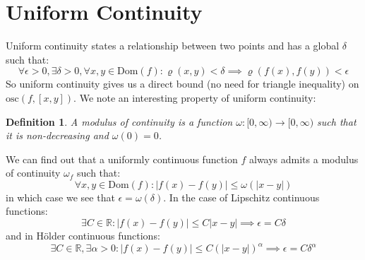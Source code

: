 \documentclass[10pt,letterpaper]{article} %
\newtheorem{defn}{Definition}[section]
\begin{document}
\section{Uniform Continuity}
Uniform continuity states a relationship between two points and has a global $\delta$ such that:
\begin{equation*}
\forall \epsilon > 0, \exists \delta > 0, \forall x, y \in \text{Dom}(f): \varrho(x, y) < \delta \implies \varrho(f(x), f(y)) < \epsilon
\end{equation*}
So uniform continuity gives us a direct bound (no need for triangle inequality) on $\text{osc}(f, [x, y])$. We note an interesting property of uniform continuity:
\begin{defn}
A modulus of continuity is a function $\omega: [0, \infty) \xrightarrow{} [0, \infty)$ such that it is non-decreasing and $\omega(0) = 0$.
\end{defn}
We can find out that a uniformly continuous function $f$ always admits a modulus of continuity $\omega_f$ such that:
\begin{equation*}
\forall x, y \in \text{Dom}(f): |f(x) - f(y)| \leqslant \omega(|x-y|)
\end{equation*}
in which case we see that $\epsilon = \omega(\delta)$. In the case of Lipschitz continuous functions:
\begin{equation*}
\exists C \in \mathbb{R}: |f(x) - f(y)| \leqslant C|x-y| \implies \epsilon = C\delta
\end{equation*}
and in H\"older continuous functions:
\begin{equation*}
\exists C \in \mathbb{R}, \exists \alpha > 0: |f(x) - f(y)| \leqslant C(|x-y|)^\alpha \implies \epsilon = C\delta^\alpha
\end{equation*}
\end{document}
